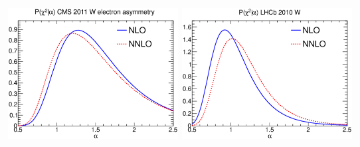 \documentclass[10pt]{beamer}
\begin{document}
\begin{frame}
\begin{figure}
\begin{center}
      \includegraphics[width=0.4\textwidth]{palpha-cmswasy.eps}
      \includegraphics[width=0.4\textwidth]{palpha-lhcb.eps}
    \end{center}
\end{figure}

\end{frame}
\end{document}
